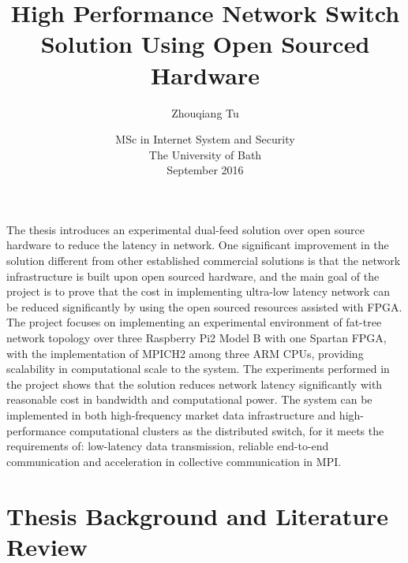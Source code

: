 \documentclass[11pt,openright,a4paper]{report}
\title{High Performance Network Switch Solution Using Open Sourced Hardware}
\author{Zhouqiang Tu}
\date{MSc in Internet System and Security\\The University of Bath\\September 2016}
\begin{document}
\lstset{language=Java,breaklines,breakatwhitespace,basicstyle=\small}


\setcounter{page}{0}


\maketitle
\newpage


\newpage


\newpage


\abstract
The thesis introduces an experimental dual-feed solution over open source hardware to reduce the latency in network. One significant improvement in the solution different from other established commercial solutions is that the network infrastructure is built upon open sourced hardware, and the main goal of the project is to prove that the cost in implementing ultra-low latency network can be reduced significantly by using the open sourced resources assisted with FPGA. The project focuses on implementing an experimental environment of fat-tree network topology over three Raspberry Pi2 Model B with one Spartan FPGA, with the implementation of MPICH2 among three ARM CPUs, providing scalability in computational scale to the system. The experiments performed in the project shows that the solution reduces network latency significantly with reasonable cost in bandwidth and computational power. The system can be implemented in both high-frequency market data infrastructure and high-performance computational clusters as the distributed switch, for it meets the requirements of: low-latency data transmission, reliable end-to-end communication and acceleration in collective communication in MPI.  
\newpage

\tableofcontents
\newpage
\listoffigures
\newpage
\listoftables
\newpage

\setcounter{page}{1}



\chapter{Thesis Background and Literature Review}
\end{document}
